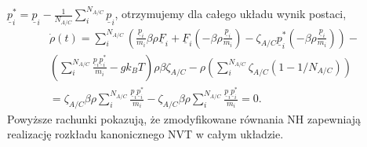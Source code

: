 \documentclass[12pt,a4paper,openright]{report} %
\begin{document}
$\underline{p}^{*}_i=\underline{p}_i - \frac{1}{N_{A/C}} \sum_{i}^{N_{A/C}} \underline{p}_i$,
otrzymujemy dla całego układu wynik postaci, 
\begin{equation}
\begin{gathered}
\dot{\rho}(t)=\sum_{i}^{N_{A/C}}\left ( \frac{\underline{p}_i}{m_i} \beta \rho \underline{F}_i + \underline{F}_i \left ( -\beta \rho \frac{\underline{p}_i}{m_i} \right)  -\zeta_{A/C} \underline{p}^{*}_i \left ( -\beta\rho\frac{\underline{p}_i}{m_i} \right ) \right) - \\ \left ( \sum_{i}^{N_{A/C}} \frac{\underline{p}_i \underline{p}^{*}_i}{m_i} -g k_B T \right ) \rho \beta \zeta_{A/C} - \rho \left ( \sum_{i}^{N_{A/C}} \zeta_{A/C} \left ( 1-1/N_{A/C} \right ) \right ) \\
= \zeta_{A/C} \beta \rho \sum_{i}^{N_{A/C}} \frac{\underline{p}_i \underline{p}^{*}_i}{m_i} - \zeta_{A/C} \beta \rho \sum_{i}^{N_{A/C}} \frac{\underline{p}_i \underline{p}^{*}_i}{m_i} = 0.
\end{gathered}
\end{equation}
Powyższe rachunki pokazują, że zmodyfikowane równania NH zapewniają realizację rozkładu kanonicznego NVT w całym układzie.
%
%
%
\end{document}

